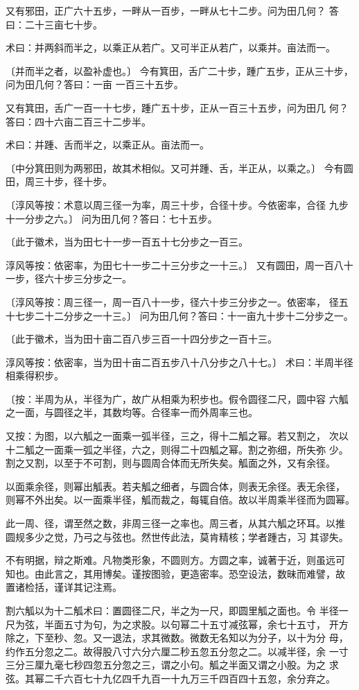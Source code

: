 \documentclass[a4paper,12pt,UTF8,twoside]{ctexbook}
\begin{document}
又有邪田，正广六十五步，一畔从一百步，一畔从七十二步。问为田几何？ 答曰：二十三亩七十步。

术曰：并两斜而半之，以乘正从若广。又可半正从若广，以乘并。亩法而一。

〔并而半之者，以盈补虚也。〕 今有箕田，舌广二十步，踵广五步，正从三十步，问为田几何？答曰：一亩 一百三十五步。

又有箕田，舌广一百一十七步，踵广五十步，正从一百三十五步，问为田几 何？答曰：四十六亩二百三十二步半。

术曰：并踵、舌而半之，以乘正从。亩法而一。

〔中分箕田则为两邪田，故其术相似。又可并踵、舌，半正从，以乘之。〕 今有圆田，周三十步，径十步。

〔淳风等按：术意以周三径一为率，周三十步，合径十步。今依密率，合径 九步十一分步之六。〕 问为田几何？答曰：七十五步。

〔此于徽术，当为田七十一步一百五十七分步之一百三。

淳风等按：依密率，为田七十一步二十三分步之一十三。〕 又有圆田，周一百八十一步，径六十步三分步之一。

〔淳风等按：周三径一，周一百八十一步，径六十步三分步之一。依密率， 径五十七步二十二分步之一十三。〕 问为田几何？答曰：十一亩九十步十二分步之一。

〔此于徽术，当为田十亩二百八步三百一十四分步之一百十三。

淳风等按：依密率，当为田十亩二百五步八十八分步之八十七。〕 术曰：半周半径相乘得积步。

〔按：半周为从，半径为广，故广从相乘为积步也。假令圆径二尺，圆中容 六觚之一面，与圆径之半，其数均等。合径率一而外周率三也。

又按：为图，以六觚之一面乘一弧半径，三之，得十二觚之幂。若又割之， 次以十二觚之一面乘一弧之半径，六之，则得二十四觚之幂。割之弥细，所失弥 少。割之又割，以至于不可割，则与圆周合体而无所失矣。觚面之外，又有余径。

以面乘余径，则幂出觚表。若夫觚之细者，与圆合体，则表无余径。表无余径， 则幂不外出矣。以一面乘半径，觚而裁之，每辄自倍。故以半周乘半径而为圆幂。

此一周、径，谓至然之数，非周三径一之率也。周三者，从其六觚之环耳。以推 圆规多少之觉，乃弓之与弦也。然世传此法，莫肯精核；学者踵古，习 其谬失。

不有明据，辩之斯难。凡物类形象，不圆则方。方圆之率，诚著于近，则虽远可 知也。由此言之，其用博矣。谨按图验，更造密率。恐空设法，数昧而难譬，故 置诸检括，谨详其记注焉。

割六觚以为十二觚术曰：置圆径二尺，半之为一尺，即圆里觚之面也。令 半径一尺为弦，半面五寸为句，为之求股。以句幂二十五寸减弦幂，余七十五寸， 开方除之，下至秒、忽。又一退法，求其微数。微数无名知以为分子，以十为分 母，约作五分忽之二。故得股八寸六分六厘二秒五忽五分忽之二。以减半径，余 一寸三分三厘九毫七秒四忽五分忽之三，谓之小句。觚之半面又谓之小股。为之 求弦。其幂二千六百七十九亿四千九百一十九万三千四百四十五忽，余分弃之。
\end{document}
